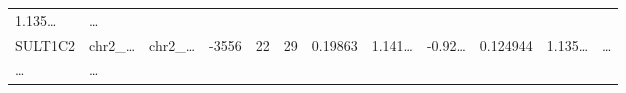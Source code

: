 \documentclass[
]{article}
\begin{document}
\begin{longtable}[]{@{}llllllllllll@{}}
\begin{minipage}[t]{0.09\columnwidth}
1.135\ldots{}\strut
\end{minipage} & \begin{minipage}[t]{0.02\columnwidth}\raggedright
\ldots{}\strut
\end{minipage}\tabularnewline
\begin{minipage}[t]{0.06\columnwidth}\raggedright
SULT1C2\strut
\end{minipage} & \begin{minipage}[t]{0.06\columnwidth}\raggedright
chr2\_\ldots{}\strut
\end{minipage} & \begin{minipage}[t]{0.06\columnwidth}\raggedright
chr2\_\ldots{}\strut
\end{minipage} & \begin{minipage}[t]{0.06\columnwidth}\raggedright
-3556\strut
\end{minipage} & \begin{minipage}[t]{0.06\columnwidth}\raggedright
22\strut
\end{minipage} & \begin{minipage}[t]{0.06\columnwidth}\raggedright
29\strut
\end{minipage} & \begin{minipage}[t]{0.06\columnwidth}\raggedright
0.19863\strut
\end{minipage} & \begin{minipage}[t]{0.08\columnwidth}\raggedright
1.141\ldots{}\strut
\end{minipage} & \begin{minipage}[t]{0.06\columnwidth}\raggedright
-0.92\ldots{}\strut
\end{minipage} & \begin{minipage}[t]{0.06\columnwidth}\raggedright
0.124944\strut
\end{minipage} & \begin{minipage}[t]{0.09\columnwidth}\raggedright
1.135\ldots{}\strut
\end{minipage} & \begin{minipage}[t]{0.02\columnwidth}\raggedright
\ldots{}\strut
\end{minipage}\tabularnewline
\begin{minipage}[t]{0.06\columnwidth}\raggedright
\ldots{}\strut
\end{minipage} & \begin{minipage}[t]{0.06\columnwidth}\raggedright
\ldots{}\strut
\end{minipage} & \begin{minipage}[t]{0.06\columnwidth}\raggedright

\end{minipage}
\end{longtable}
\end{document}
